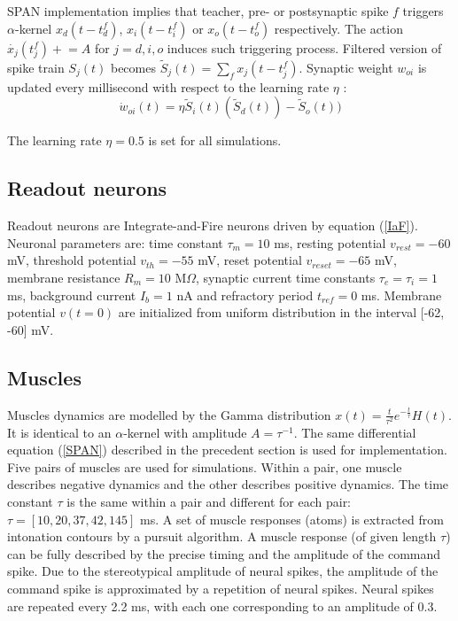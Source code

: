 \documentclass[11pt, a4paper]{article} %
\begin{document}
SPAN implementation implies that teacher, pre- or postsynaptic spike $f$ triggers $\alpha$-kernel $x_d(t-t_d^f)$, $x_i(t-t_i^f)$ or $x_o(t-t_o^f)$ respectively. The action $\dot{x_{j}}(t_{j}^f) \mathrel{+} = A$ for $j = d,i,o$ induces such triggering process. Filtered version of spike train $S_j(t)$ becomes $\widetilde{S}_j(t) = \sum\limits_f x_j(t-t_j^f)$. Synaptic weight $w_{oi}$ is updated every millisecond with respect to the learning rate $\eta$ : \begin{equation}
\dot{w}_{oi}(t) = \eta \widetilde{S}_i(t)(\widetilde{S}_d(t)) - \widetilde{S}_o(t))
\end{equation}

The learning rate $\eta = 0.5$ is set for all simulations.

\subsection{Readout neurons}
Readout neurons are Integrate-and-Fire neurons driven by equation (\ref{IaF}). Neuronal parameters are: time constant $\tau_m = 10$ ms, resting potential $v_{rest} = -60$ mV, threshold potential $v_{th} = -55$ mV, reset potential $v_{reset} = -65$ mV, membrane resistance $R_m = 10$ M$\Omega$, synaptic current time constants $\tau_e = \tau_i = 1$ ms, background current $I_b = 1$ nA and refractory period $t_{ref} = 0$ ms. Membrane potential $v(t=0)$ are initialized from uniform distribution in the interval [-62, -60] mV.

\subsection{Muscles}
Muscles dynamics are modelled by the Gamma distribution $x(t) = \frac{t}{\tau^2} e^{-\frac{t}{\tau}} H(t)$. It is identical to an $\alpha$-kernel with amplitude $A = \tau^{-1}$. The same differential equation (\ref{SPAN}) described in the precedent section is used for implementation. Five pairs of muscles are used for simulations. Within a pair, one muscle describes negative dynamics and the other describes positive dynamics. The time constant $\tau$ is the same within a pair and different for each pair: $\tau = [10, 20, 37, 42, 145]$ ms. A set of muscle responses (atoms) is extracted from intonation contours by a pursuit algorithm. A muscle response (of given length $\tau$) can be fully described by the precise timing and the amplitude of the command spike. Due to the stereotypical amplitude of neural spikes, the amplitude of the command spike is approximated by a repetition of neural spikes. Neural spikes are repeated every 2.2 ms, with each one corresponding to an amplitude of 0.3.
\end{document}
